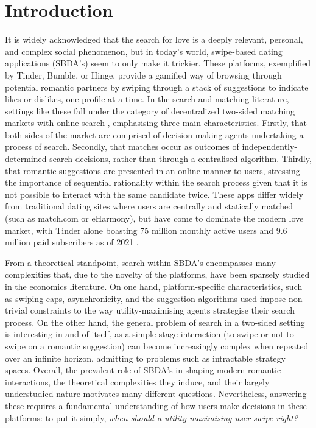\section{Introduction}
\label{sec:Introduction} 

It is widely acknowledged that the search for love is a deeply relevant, personal, and complex social phenomenon, but in today's world, swipe-based dating applications (SBDA's) seem to only make it trickier. 
These platforms, exemplified by Tinder, Bumble, or Hinge, provide a gamified way of browsing through potential romantic partners by swiping through a stack of suggestions to indicate likes or dislikes, one profile at a time. 
In the search and matching literature, settings like these fall under the category of decentralized two-sided matching markets with online search \citep{kanoria2021facilitating}, emphasising three main characteristics. 
Firstly, that both sides of the market are comprised of decision-making agents undertaking a process of search. 
Secondly, that matches occur as outcomes of independently-determined search decisions, rather than through a centralised algorithm. Thirdly, that romantic suggestions are presented in an online manner to users, stressing the importance of sequential rationality within the search process given that it is not possible to interact with the same candidate twice. 
These apps differ widely from traditional dating sites where users are centrally and statically matched (such as match.com or eHarmony), but have come to dominate the modern love market, with Tinder alone boasting 75 million monthly active users and 9.6 million paid subscribers as of 2021 \citep{web:tinder_stats}.


From a theoretical standpoint, search within SBDA's encompasses many complexities that, due to the novelty of the platforms, have been sparsely studied in the economics literature. 
On one hand, platform-specific characteristics, such as swiping caps, asynchronicity, and the suggestion algorithms used impose non-trivial constraints to the way utility-maximising agents strategise their search process.
On the other hand, the general problem of search in a two-sided setting is interesting in and of itself, as a simple stage interaction (to swipe or not to swipe on a romantic suggestion) can become increasingly complex when repeated over an infinite horizon, admitting to problems such as intractable strategy spaces. 
Overall, the prevalent role of SBDA's in shaping modern romantic interactions, the theoretical complexities they induce, and their largely understudied nature motivates many different questions. 
Nevertheless, answering these requires a fundamental understanding of how users make decisions in these platforms: to put it simply, \textit{when should a utility-maximising user swipe right?} 


